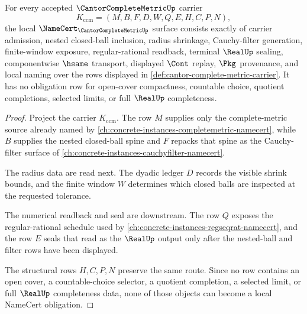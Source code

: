 \begin{theorem}
\label{thm:cantor-complete-metric-namecert-obligations}
For every accepted $\CantorCompleteMetricUp$ carrier
$$
K_{\mathrm{ccm}}=(M,B,F,D,W,Q,E,H,C,P,N),
$$
the local $\NameCert_{\CantorCompleteMetricUp}$ surface consists exactly of carrier admission, nested closed-ball inclusion, radius shrinkage, Cauchy-filter generation, finite-window exposure, regular-rational readback, terminal $\RealUp$ sealing, componentwise $\hsame$ transport, displayed $\Cont$ replay, $\Pkg$ provenance, and local naming over the rows displayed in \autoref{def:cantor-complete-metric-carrier}. It has no obligation row for open-cover compactness, countable choice, quotient completions, selected limits, or full $\RealUp$ completeness.
\end{theorem}
\begin{proof}
Project the carrier $K_{\mathrm{ccm}}$. The row $M$ supplies only the complete-metric source already named by \autoref{ch:concrete-instances-completemetric-namecert}, while $B$ supplies the nested closed-ball spine and $F$ repacks that spine as the Cauchy-filter surface of \autoref{ch:concrete-instances-cauchyfilter-namecert}.

The radius data are read next. The dyadic ledger $D$ records the visible shrink bounds, and the finite window $W$ determines which closed balls are inspected at the requested tolerance.

The numerical readback and seal are downstream. The row $Q$ exposes the regular-rational schedule used by \autoref{ch:concrete-instances-regseqrat-namecert}, and the row $E$ seals that read as the $\RealUp$ output only after the nested-ball and filter rows have been displayed.

The structural rows $H,C,P,N$ preserve the same route. Since no row contains an open cover, a countable-choice selector, a quotient completion, a selected limit, or full $\RealUp$ completeness data, none of those objects can become a local NameCert obligation.
\end{proof}

